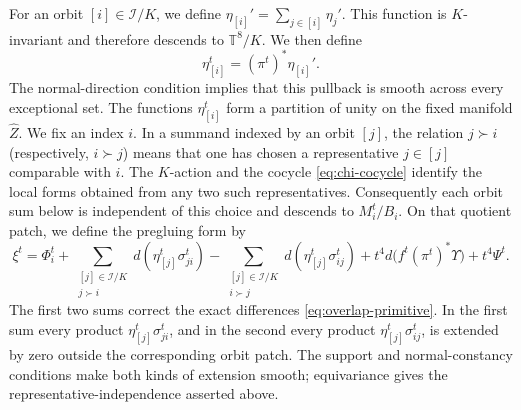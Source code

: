 \documentclass[11pt]{article}
\theoremstyle{remark}\newtheorem{remark}[theorem]{Remark}
\newcommand{\T}{\mathbb T}
\begin{document}
For an orbit $[i]\in\mathcal I/K$, we define
$\eta_{[i]}'=\sum_{j\in[i]}\eta_j'$.  This function is $K$-invariant and
therefore descends to $\T^8/K$.  We then define
\[
 \eta_{[i]}^t=(\pi^t)^*\eta_{[i]}'.
\]
The normal-direction condition implies that this pullback is smooth
across every exceptional set.  The functions $\eta_{[i]}^t$ form a
partition of unity on the fixed manifold $\widehat Z$.  We fix an index
$i$.  In a summand indexed by an orbit $[j]$, the relation $j\succ i$
(respectively, $i\succ j$) means that one has chosen a representative
$j\in[j]$ comparable with $i$.  The $K$-action and the
cocycle \eqref{eq:chi-cocycle} identify the local forms obtained from
any two such representatives.  Consequently each orbit sum below is
independent of this choice and descends to $M_i^t/B_i$.  On that quotient
patch, we define the pregluing form by
\begin{equation}\label{eq:Joyce-pregluing}
 \xi^t=\Phi_i^t
 +\sum_{\substack{[j]\in\mathcal I/K\\ j\succ i}}
       d(\eta_{[j]}^t\sigma_{ji}^t)
 -\sum_{\substack{[j]\in\mathcal I/K\\ i\succ j}}
       d(\eta_{[j]}^t\sigma_{ij}^t)
 +t^4d\bigl(f^t(\pi^t)^*\Upsilon\bigr)+t^4\Psi^t.
\end{equation}
The first two sums correct the exact differences
\eqref{eq:overlap-primitive}.  In the first sum every product
$\eta_{[j]}^t\sigma_{ji}^t$, and in the second every product
$\eta_{[j]}^t\sigma_{ij}^t$, is extended by zero outside the corresponding
orbit patch.  The support and normal-constancy conditions make both kinds
of extension smooth; equivariance gives the representative-independence
asserted above.
\end{document}
